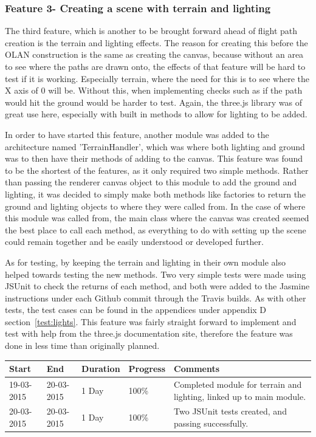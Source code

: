 \subsubsection{Feature 3- Creating a scene with terrain and lighting}
The third feature, which is another to be brought forward ahead of flight path creation is the terrain and lighting effects. The reason for creating this before the OLAN construction is the same as creating the canvas, because without an area to see where the paths are drawn onto, the effects of that feature will be hard to test if it is working. Especially terrain, where the need for this is to see where the X axis of 0 will be. Without this, when implementing checks such as if the path would hit the ground would be harder to test. Again, the three.js library was of great use here, especially with built in methods to allow for lighting to be added.

In order to have started this feature, another module was added to the architecture named 'TerrainHandler', which was where both lighting and ground was to then have their methods of adding to the canvas. This feature was found to be the shortest of the features, as it only required two simple methods. Rather than passing the renderer canvas object to this module to add the ground and lighting, it was decided to simply make both methods like factories to return the ground and lighting objects to where they were called from. In the case of where this module was called from, the main class where the canvas was created seemed the best place to call each method, as everything to do with setting up the scene could remain together and be easily understood or developed further.

As for testing, by keeping the terrain and lighting in their own module also helped towards testing the new methods. Two very simple tests were made using JSUnit to check the returns of each method, and both were added to the Jasmine instructions under each Github commit through the Travis builds. As with other tests, the test cases can be found in the appendices under appendix D section~\ref{test:lights}. This feature was fairly straight forward to implement and test with help from the three.js documentation site, therefore the feature was done in less time than originally planned.

\begin{table}[h]
\begin{tabular}{|l|l|l|l|p{7cm}|}
\hline
\textbf{Start} & \textbf{End} & \textbf{Duration} & \textbf{Progress} & \textbf{Comments}                                                                                                     \\ \hline
19-03-2015     & 20-03-2015   & 1 Day            & 100\%             &  Completed module for terrain and lighting, linked up to main module.\\ \hline
20-03-2015     & 20-03-2015   & 1 Day            & 100\%             &  Two JSUnit tests created, and passing successfully.\\ \hline
\end{tabular}
\end{table}

